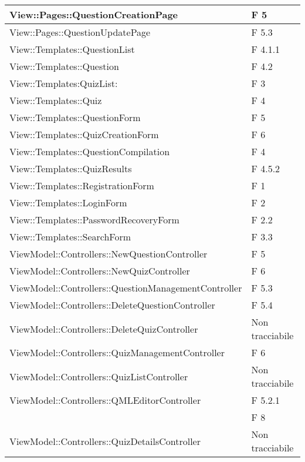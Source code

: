\begin{longtable}{p{}p{}}
\midrule
View::Pages::QuestionCreationPage	& F 5\\

\midrule
View::Pages::QuestionUpdatePage	& F 5.3\\


\midrule
View::Templates::QuestionList	& F 4.1.1\\
\midrule
View::Templates::Question	& F 4.2\\
\midrule
View::Templates:QuizList:	& F 3\\
\midrule
View::Templates::Quiz	& F 4\\
\midrule
View::Templates::QuestionForm	& F 5\\
\midrule
View::Templates::QuizCreationForm	& F 6\\
\midrule
View::Templates::QuestionCompilation	& F 4\\
\midrule
View::Templates::QuizResults	& F 4.5.2\\
\midrule
View::Templates::RegistrationForm	& F 1\\
\midrule
View::Templates::LoginForm	& F 2\\
\midrule
View::Templates::PasswordRecoveryForm	& F 2.2\\
\midrule
View::Templates::SearchForm	& F 3.3\\




\midrule
ViewModel::Controllers::NewQuestionController	& F 5\\
\midrule
ViewModel::Controllers::NewQuizController	& F 6\\
\midrule
ViewModel::Controllers::QuestionManagementController	& F 5.3\\
\midrule
ViewModel::Controllers::DeleteQuestionController	& F 5.4\\
\midrule
ViewModel::Controllers::DeleteQuizController	& Non tracciabile\\
\midrule
ViewModel::Controllers::QuizManagementController	& F 6\\
\midrule
ViewModel::Controllers::QuizListController	& Non tracciabile\\
\midrule
ViewModel::Controllers::QMLEditorController	& F 5.2.1\\
							& F 8\\
\midrule
ViewModel::Controllers::QuizDetailsController	& Non tracciabile\\


\end{longtable}
